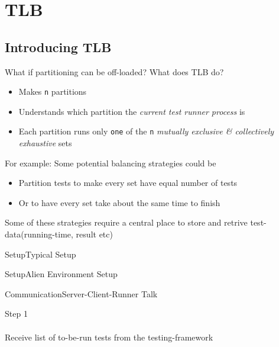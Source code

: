 \documentclass{beamer}
\begin{document}
\section{TLB}

\subsection{Introducing TLB}

\begin{frame}{What if partitioning can be off-loaded?}
  What does TLB do?
  \begin{itemize}
  \item Makes \texttt{n} partitions
    \pause
  \item Understands which partition the \emph{current test runner process} is
    \pause
  \item Each partition runs only \texttt{one} of the \texttt{n} \emph{mutually exclusive \& collectively exhaustive} sets
  \end{itemize}
\end{frame}

\begin{frame}{For example:}
  Some potential balancing strategies could be
  \pause
  \begin{itemize}
    \item Partition tests to make every set have equal number of tests
      \pause
    \item Or to have every set take about the same time to finish
  \end{itemize}
  \pause
  Some of these strategies require a central place to store and retrive test-data(running-time, result etc)
\end{frame}

\begin{frame}{Setup}{Typical Setup}
  \begin{centering}
  \end{centering}
\end{frame}

\begin{frame}{Setup}{Alien Environment Setup}
  \begin{centering}
  \end{centering}
\end{frame}

\begin{frame}{Communication}{Server-Client-Runner Talk}
  \begin{multicols}{2}
    \begin{centering}
    \end{centering}
    \begin{center}
      {\huge Step 1}\\
      \quad\\
          {\large Receive list of to-be-run tests from the testing-framework}
    \end{center}
  \end{multicols}
\end{frame}
\end{document}
